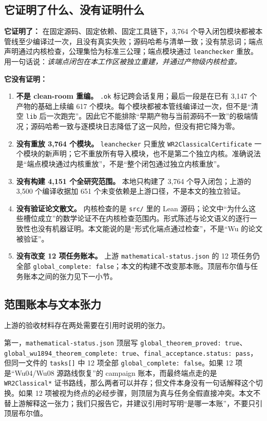 \documentclass[11pt,a4paper]{ctexart}
\theoremstyle{plain}
\theoremstyle{definition}
\begin{document}
\subsection{它证明了什么、没有证明什么}
\label{sec:wu-scope}

\textbf{它证明了：} 在固定源码、固定依赖、固定工具链下，3,764 个导入闭包模块都被本管线至少编译过一次，且没有真实失败；源码哈希与清单一致；没有禁忌词；端点声明通过内核检查，公理集恰为标准三公理；端点模块通过 \texttt{leanchecker} 重放。用一句话说：\emph{该端点闭包在本工作区被独立重建，并通过产物级内核检查。}

\textbf{它没有证明：}
\begin{enumerate}
\item \textbf{不是 clean-room 重编。} \texttt{.ok} 标记跨会话复用；最后一段是在已有 3,147 个产物的基础上续编 617 个模块。每个模块都被本管线编译过一次，但不是“清空 \texttt{lib} 后一次跑完”。因此它不能排除“早期产物与当前源码不一致”的极端情况；源码哈希一致与逐模块日志降低了这一风险，但没有把它降为零。
\item \textbf{没有重放 3,764 个模块。} \texttt{leanchecker} 只重放 \texttt{WR2ClassicalCertificate} 一个模块的新声明；它不重放所有导入模块，也不是第二个独立内核。准确说法是“端点模块通过内核重放”，不是“整个闭包通过独立内核重放”。
\item \textbf{没有构建 4,151 个全研究范围。} 本地只构建了 3,764 个导入闭包；上游的 3,500 个编译收据加 651 个未变依赖是上游口径，不是本文的独立验证。
\item \textbf{没有验证论文散文。} 内核检查的是 \texttt{src/} 里的 Lean 源码；论文中“为什么这些槽位成立”的数学论证不在内核检查范围内。形式陈述与论文语义的逐行一致性也没有机器证明。本文能说的是“形式化端点通过检查”，不是“Wu 的论文被验证”。
\item \textbf{没有改变 12 项任务账本。} 上游 \texttt{mathematical-status.json} 的 12 项任务仍全部 \texttt{global\_complete: false}；本文的构建不改变那本账。顶层布尔值与任务账本之间的张力见下一小节。
\end{enumerate}

\subsection{范围账本与文本张力}
\label{sec:wu-tension}

上游的验收材料存在两处需要在引用时说明的张力。

{\raggedright
第一，\texttt{mathematical-status.json} 顶层写 \texttt{global\_theorem\_proved: true}、\texttt{global\_wu1894\_theorem\_complete: true}、\texttt{final\_acceptance.status: pass}，但同一文件的 \texttt{tasks[]} 中 12 项全部 \texttt{global\_complete: false}。如果 12 项是“Wu04/Wu08 源路线恢复”的 campaign 账本，而最终端点走的是 \texttt{WR2Classical*} 证书路线，那么两者可以并存；但文件本身没有一句话解释这个切换。如果 12 项被视为终点的必经步骤，则顶层为真与任务全假直接冲突。本文不替上游解释这一张力；我们只报告它，并建议引用时写明“是哪一本账”，不要只引顶层布尔值。
\par}
\end{document}
